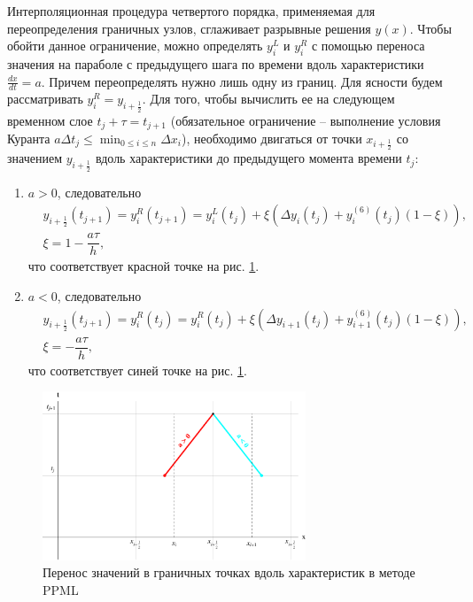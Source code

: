 \documentclass[12pt,a4paper]{article}
\newcommand{\picref}[1]{рис. \ref{#1}}
\newcommand{\half}{\frac{1}{2}}
\begin{document}
    Интерполяционная процедура четвертого порядка, применяемая для переопределения граничных узлов, сглаживает разрывные решения $y(x)$. Чтобы обойти данное ограничение, можно определять $ y_i^L $ и $ y_i^R $ с помощью переноса значения на параболе с предыдущего шага по времени вдоль характеристики $ \frac{dx}{dt} = a $. Причем переопределять нужно лишь одну из границ. Для ясности  будем рассматривать $y_i^R = y_{i+\half}$. Для того, чтобы вычислить ее на следующем временном слое $ t_j + \tau = t_{j+1}$ (обязательное ограничение -- выполнение условия Куранта $ a \Delta t_j \leq \min_{0 \leq i \leq n}\Delta x_i $), необходимо двигаться от точки $ x_{i+\half} $ со значением $ y_{i+\half} $ вдоль характеристики до предыдущего момента времени $ t_j $:
    \begin{enumerate}
        \item $ a > 0 $, следовательно
        \begin{equation}
            \label{ppml_boundary}
            \begin{split}
                &y_{i+\half}(t_{j+1}) = y_i^R(t_{j+1}) = y_i^L(t_j) + \xi(\Delta y_i(t_j) + y_i^{(6)}(t_j)(1-\xi)), \\[0.7em]
                &\xi = 1 -  \dfrac{a \tau}{h},
            \end{split}
        \end{equation}
        \noindent что соответствует красной точке на \picref{fig:ppml_visual}.

        \item $ a < 0 $, следовательно
        \[
            \begin{split}
                &y_{i+\half}(t_{j+1}) = y_i^R(t_j) = y_i^R(t_j) + \xi(\Delta y_{i+1}(t_j) + y_{i+1}^{(6)}(t_j)(1-\xi)), \\[0.7em]
                &\xi = -\dfrac{a \tau}{h},
            \end{split}  
        \]
        \noindent что соответствует синей точке на \picref{fig:ppml_visual}.
    \end{enumerate}

    \begin{figure}[h]
        \centering
        \includegraphics[width=0.7\textwidth]{ppml_visual.pdf}
        \caption{Перенос значений в граничных точках вдоль характеристик в методе PPML}
        \label{fig:ppml_visual}
    \end{figure}
\end{document}
